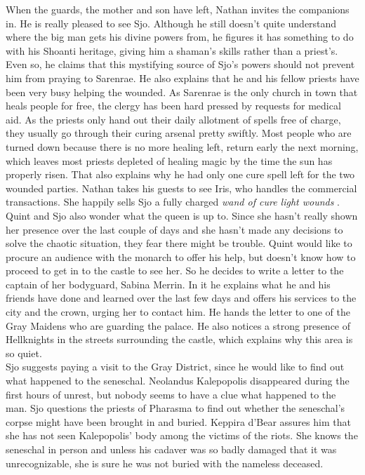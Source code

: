 When the guards, the mother and son have left, Nathan invites the companions in. He is really pleased to see Sjo. Although he still doesn't quite understand where the big man gets his divine powers from, he figures it has something to do with his Shoanti heritage, giving him a shaman's skills rather than a priest's. Even so, he claims that this mystifying source of Sjo's powers should not prevent him from praying to Sarenrae. He also explains that he and his fellow priests have been very busy helping the wounded. As Sarenrae is the only church in town that heals people for free, the clergy has been hard pressed by requests for medical aid. As the priests only hand out their daily allotment of spells free of charge, they usually go through their curing arsenal pretty swiftly. Most people who are turned down because there is no more healing left, return early the next morning, which leaves most priests depleted of healing magic by the time the sun has properly risen. That also explains why he had only one cure spell left for the two wounded parties. Nathan takes his guests to see Iris, who handles the commercial transactions. She happily sells Sjo a fully charged {\itshape wand of cure light wounds} . Quint and Sjo also wonder what the queen is up to. Since she hasn't really shown her presence over the last couple of days and she hasn't made any decisions to solve the chaotic situation, they fear there might be trouble. Quint would like to procure an audience with the monarch to offer his help, but doesn't know how to proceed to get in to the castle to see her. So he decides to write a letter to the captain of her bodyguard, Sabina Merrin. In it he explains what he and his friends have done and learned over the last few days and offers his services to the city and the crown, urging her to contact him. He hands the letter to one of the Gray Maidens who are guarding the palace. He also notices a strong presence of Hellknights in the streets surrounding the castle, which explains why this area is so quiet.\\

Sjo suggests paying a visit to the Gray District, since he would like to find out what happened to the seneschal. Neolandus Kalepopolis disappeared during the first hours of unrest, but nobody seems to have a clue what happened to the man. Sjo questions the priests of Pharasma to find out whether the seneschal's corpse might have been brought in and buried. Keppira d'Bear assures him that she has not seen Kalepopolis' body among the victims of the riots. She knows the seneschal in person and unless his cadaver was so badly damaged that it was unrecognizable, she is sure he was not buried with the nameless deceased.\\

